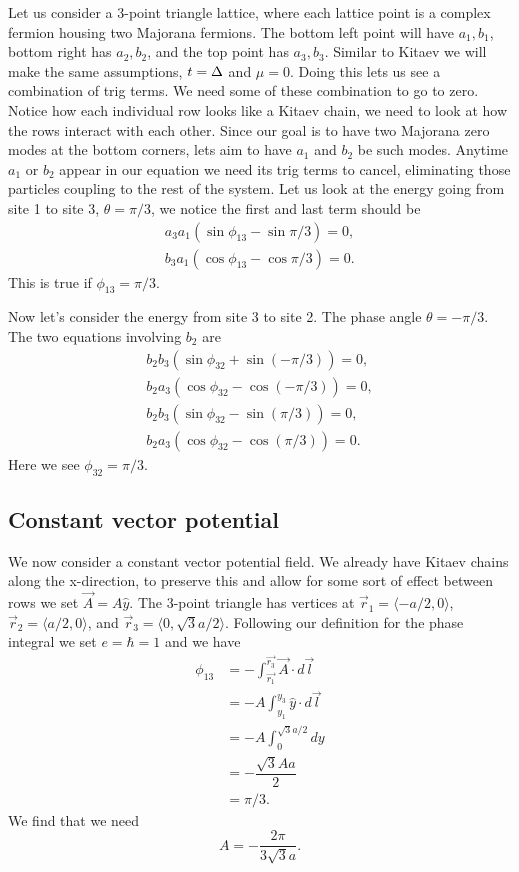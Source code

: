 Let us consider a 3-point triangle lattice, where each lattice point is a complex fermion housing two Majorana fermions.
The bottom left point will have $a_1, b_1$, bottom right has $a_2, b_2$, and the top point has $a_3, b_3$.
Similar to Kitaev we will make the same assumptions, $t=\Delta$ and $\mu=0$.
Doing this lets us see a combination of trig terms.
We need some of these combination to go to zero.
Notice how each individual row looks like a Kitaev chain, we need to look at how the rows interact with each other.
Since our goal is to have two Majorana zero modes at the bottom corners, lets aim to have $a_1$ and $b_2$ be such modes.
Anytime $a_1$ or $b_2$ appear in our equation we need its trig terms to cancel, eliminating those particles coupling to the rest of the system.
Let us look at the energy going from site 1 to site 3, $\theta = \pi/3$, we notice the first and last term should be
\begin{align}
  a_3 a_1 (\sin\phi_{13} - \sin\pi/3) = 0, \\
  b_3 a_1 (\cos\phi_{13} - \cos\pi/3) = 0.
\end{align}
This is true if $\phi_{13} = \pi/3$.

Now let's consider the energy from site 3 to site 2.
The phase angle $\theta = -\pi/3$.
The two equations involving $b_2$ are
\begin{align}
  b_2 b_3 (\sin\phi_{32} + \sin(-\pi/3)) = 0, \nonumber \\
  b_2 a_3 (\cos\phi_{32} - \cos(-\pi/3)) = 0, \nonumber \\
  b_2 b_3 (\sin\phi_{32} - \sin(\pi/3)) = 0, \nonumber \\
  b_2 a_3 (\cos\phi_{32} - \cos(\pi/3)) = 0. \nonumber
\end{align}
Here we see $\phi_{32} = \pi/3$.

\subsection{Constant vector potential}

We now consider a constant vector potential field.
We already have Kitaev chains along the x-direction, to preserve this and allow for some sort of effect between rows we set $\vec{A} = A\hat{y}$.
The 3-point triangle has vertices at $\vec{r}_1 = \langle -a/2,0\rangle$, $\vec{r}_2 = \langle a/2,0\rangle$, and $\vec{r}_3 = \langle 0,\sqrt{3}a/2\rangle$.
Following our definition for the phase integral we set $e=\hbar=1$ and we have
\begin{align}
  \phi_{13} &= -\int_{\vec{r_1}}^{\vec{r_3}} \vec{A} \cdot d\vec{l} \nonumber \\
  &= -A \int_{y_1}^{y_3} \hat{y} \cdot d\vec{l} \nonumber \\
  &= -A \int_0^{\sqrt{3}a/2} dy \nonumber \\
  &= -\dfrac{\sqrt{3} A a}{2} \nonumber \\
  &= \pi/3. \nonumber
\end{align}
We find that we need
\begin{equation} \label{constant vector potential magnitude}
  A = -\dfrac{2 \pi}{3 \sqrt{3} a}.
\end{equation}

